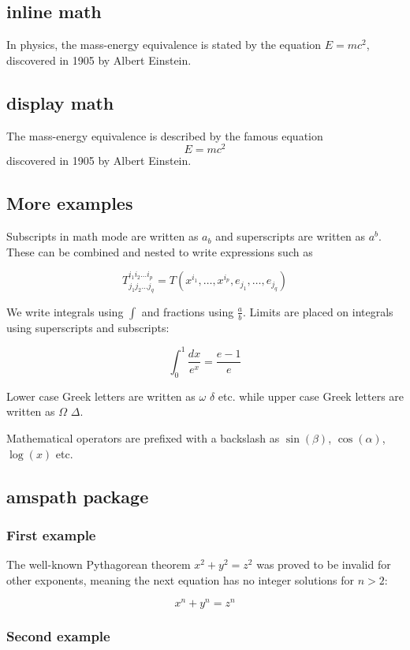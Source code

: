 \documentclass[12pt, letterpaper]{article}
\begin{document}
\subsection{inline math}
In physics, the mass-energy equivalence is stated 
by the equation $E=mc^2$, discovered in 1905 by Albert Einstein.

\subsection{display math}
The mass-energy equivalence is described by the famous equation \[ E=mc^2\] discovered in 1905 by Albert Einstein.

\subsection{More examples}
Subscripts in math mode are written as $a_b$ and superscripts are written as $a^b$. These can be combined and nested to write expressions such as

\[ T^{i_1 i_2 \dots i_p}_{j_1 j_2 \dots j_q} = T(x^{i_1},\dots,x^{i_p},e_{j_1},\dots,e_{j_q}) \]
 
We write integrals using $\int$ and fractions using $\frac{a}{b}$. Limits are placed on integrals using superscripts and subscripts:

\[ \int_0^1 \frac{dx}{e^x} =  \frac{e-1}{e} \]

Lower case Greek letters are written as $\omega$ $\delta$ etc. while upper case Greek letters are written as $\Omega$ $\Delta$.

Mathematical operators are prefixed with a backslash as $\sin(\beta)$, $\cos(\alpha)$, $\log(x)$ etc.

\subsection{amspath package}
\subsubsection{First example}

The well-known Pythagorean theorem \(x^2 + y^2 = z^2\) was proved to be invalid for other exponents, meaning the next equation has no integer solutions for \(n>2\):

\[ x^n + y^n = z^n \]

\subsubsection{Second example}
\end{document}
